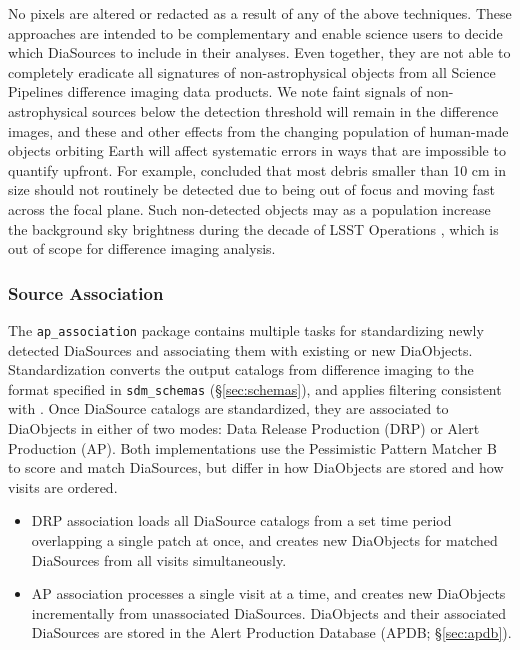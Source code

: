 No pixels are altered or redacted as a result of any of the above techniques.
These approaches are intended to be complementary and enable science users to decide which DiaSources to include in their analyses.
Even together, they are not able to completely eradicate all signatures of non-astrophysical objects from all Science Pipelines difference imaging data products.
We note faint signals of non-astrophysical sources below the detection threshold will remain in the difference images, and these and other effects from the changing population of human-made objects orbiting Earth will affect systematic errors in ways that are impossible to quantify upfront.
For example, \citet{2024ApJ...966L..38T} concluded that most debris smaller than 10 cm in size should not routinely be detected due to being out of focus and moving fast across the focal plane.
Such non-detected objects may as a population increase the background sky brightness during the decade of LSST Operations \citep{2021MNRAS.504L..40K,2023NatAs...7..252B}, which is out of scope for difference imaging analysis.


\subsubsection{Source Association}
\label{sec:association}

The \texttt{ap\_association} package contains multiple tasks for standardizing newly detected DiaSources and associating them with existing or new DiaObjects.
Standardization converts the output catalogs from difference imaging to the format specified in \texttt{sdm\_schemas} (\S\ref{sec:schemas}), and applies filtering consistent with \citep{DMTN-199}.
Once DiaSource catalogs are standardized, they are associated to DiaObjects in either of two modes: Data Release Production (DRP) or Alert Production (AP).
Both implementations use the Pessimistic Pattern Matcher B \citep{DMTN-031} to score and match DiaSources, but differ in how DiaObjects are stored and how visits are ordered.

\begin{itemize}
\item DRP association loads all DiaSource catalogs from a set time period overlapping a single patch at once, and creates new DiaObjects for matched DiaSources from all visits simultaneously.
\item AP association processes a single visit at a time, and creates new DiaObjects incrementally from unassociated DiaSources.
DiaObjects and their associated DiaSources are stored in the Alert Production Database (APDB; \S\ref{sec:apdb}).
\end{itemize}

